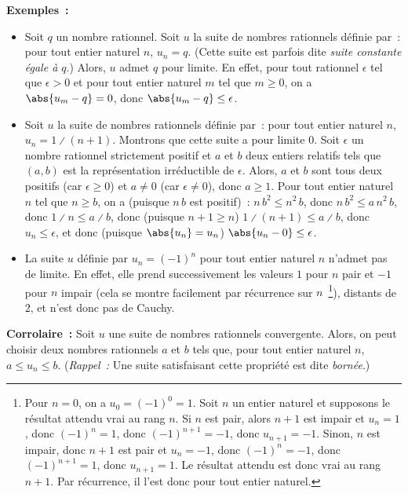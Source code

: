     \done

\medskip

\noindent\textbf{Exemples :} 
\begin{itemize}[nosep]
    \item Soit $q$ un nombre rationnel. 
        Soit $u$ la suite de nombres rationnels définie par : pour tout entier naturel $n$, $u_n = q$. 
        (Cette suite est parfois dite \emph{suite constante égale à $q$}.)
        Alors, $u$ admet $q$ pour limite.
        En effet, pour tout rationnel $\epsilon$ tel que $\epsilon > 0$ et pour tout entier naturel $m$ tel que $m \geq 0$, on a $\abs{u_m - q} = 0$, donc $\abs{u_m - q} \leq \epsilon$.
    \item Soit $u$ la suite de nombres rationnels définie par : pour tout entier naturel $n$, $u_n = 1 \divslash (n+1)$.
        Montrons que cette suite a pour limite $0$. 
        Soit $\epsilon$ un nombre rationnel strictement positif et $a$ et $b$ deux entiers relatifs tels que $(a, b)$ est la représentation irréductible de $\epsilon$.
        Alors, $a$ et $b$ sont tous deux positifs (car $\epsilon \geq 0$) et $a \neq 0$ (car $\epsilon \neq 0$), donc $a \geq 1$.
        Pour tout entier naturel $n$ tel que $n \geq b$, on a (puisque $n \, b$ est positif) : $n \, b^2 \leq n^2 \, b$, donc $n \, b^2 \leq a \, n^2 \, b$, donc $1 \divslash n \leq a \divslash b$, donc (puisque $n+1 \geq n$) $1 \divslash (n+1) \leq a \divslash b$, donc $u_n \leq \epsilon$, et donc (puisque $\abs{u_n} = u_n$) $\abs{u_n - 0} \leq \epsilon$.
    \item La suite $u$ définie par $u_n = (-1)^n$ pour tout entier naturel $n$ n'admet pas de limite.
        En effet, elle prend successivement les valeurs $1$ pour $n$ pair et $-1$ pour $n$ impair (cela se montre facilement par récurrence sur $n$~\footnote{%
    Pour $n = 0$, on a $u_0 = (-1)^0 = 1$.
    Soit $n$ un entier naturel et supposons le résultat attendu vrai au rang $n$.
    Si $n$ est pair, alors $n+1$ est impair et $u_n = 1$, donc $(-1)^n = 1$, donc $(-1)^{n+1} = -1$, donc $u_{n+1} = -1$.
    Sinon, $n$ est impair, donc $n+1$ est pair et $u_n = -1$, donc $(-1)^n = -1$, donc $(-1)^{n+1} = 1$, donc $u_{n+1} = 1$.
    Le résultat attendu est donc vrai au rang $n+1$.
    Par récurrence, il l'est donc pour tout entier naturel.
}), distants de $2$, et n'est donc pas de Cauchy. 
\end{itemize}

\medskip

\noindent\textbf{Corrolaire :} Soit $u$ une suite de nombres rationnels convergente.
    Alors, on peut choisir deux nombres rationnels $a$ et $b$ tels que, pour tout entier naturel $n$, $a \leq u_n \leq b$.
    (\emph{Rappel :} Une suite satisfaisant cette propriété est dite \emph{bornée}.)

